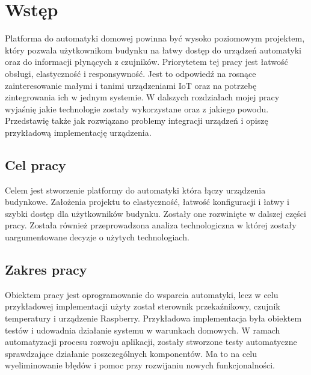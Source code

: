 \chapter{Wstęp}
Platforma do automatyki domowej powinna być wysoko poziomowym projektem, który pozwala użytkownikom budynku na łatwy dostęp do urządzeń automatyki oraz do informacji płynących z czujników. Priorytetem tej pracy jest łatwość obsługi, elastyczność i responsywność. Jest to odpowiedź na rosnące zainteresowanie małymi i tanimi urządzeniami IoT oraz na potrzebę zintegrowania ich w jednym systemie. W dalszych rozdziałach mojej pracy wyjaśnię jakie technologie zostały wykorzystane oraz z jakiego powodu.  Przedstawię także jak rozwiązano problemy integracji urządzeń i opiszę przykładową implementację urządzenia.
\section{Cel pracy}
    Celem jest stworzenie platformy do automatyki która łączy urządzenia budynkowe. Założenia projektu to elastyczność, łatwość konfiguracji i łatwy i szybki dostęp dla użytkowników budynku. Zostały one rozwinięte w dalszej części pracy. \newline
    Została również przeprowadzona analiza technologiczna w której zostały uargumentowane decyzje o użytych technologiach. 
\section{Zakres pracy}
Obiektem pracy jest oprogramowanie do wsparcia automatyki, lecz w celu przykładowej implementacji użyty został sterownik przekaźnikowy, czujnik temperatury i urządzenie Raspberry. Przykładowa implementacja była obiektem testów i udowadnia działanie systemu w warunkach domowych. W ramach automatyzacji procesu rozwoju aplikacji, zostały stworzone testy automatyczne sprawdzające działanie poszczególnych komponentów. Ma to na celu wyeliminowanie błędów i pomoc przy rozwijaniu nowych funkcjonalności.
